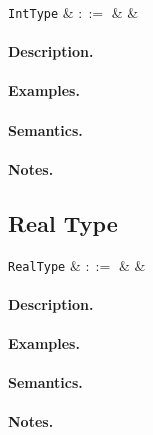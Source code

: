 \begin{syntax}
  \verb+IntType+ & $::=$ &  &\\
\end{syntax}

\paragraph{Description.}

\paragraph{Examples.}

\paragraph{Semantics.}

\paragraph{Notes.} 


\subsection{Real Type}

\begin{syntax}
  \verb+RealType+ & $::=$ &  &\\
\end{syntax}

\paragraph{Description.}

\paragraph{Examples.}

\paragraph{Semantics.}

\paragraph{Notes.} 

